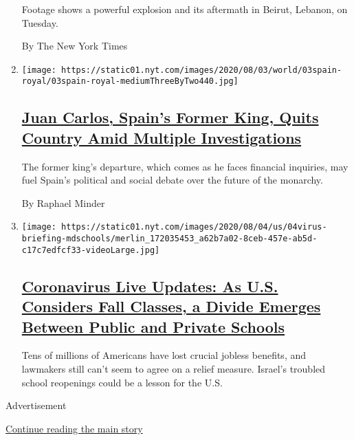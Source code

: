 \begin{enumerate}
  Footage shows a powerful explosion and its aftermath in Beirut,
  Lebanon, on Tuesday.

  By The New York Times
\item
  \texttt{[image: https://static01.nyt.com/images/2020/08/03/world/03spain-royal/03spain-royal-mediumThreeByTwo440.jpg]}

  \hypertarget{juan-carlos-spains-former-king-quits-country-amid-multiple-investigations}{%
  \subsection{\texorpdfstring{\href{/2020/08/03/world/europe/juan-carlos-leaves-spain.html}{Juan
  Carlos, Spain's Former King, Quits Country Amid Multiple
  Investigations}}{Juan Carlos, Spain's Former King, Quits Country Amid Multiple Investigations}}\label{juan-carlos-spains-former-king-quits-country-amid-multiple-investigations}}

  The former king's departure, which comes as he faces financial
  inquiries, may fuel Spain's political and social debate over the
  future of the monarchy.

  By Raphael Minder
\item
  \texttt{[image: https://static01.nyt.com/images/2020/08/04/us/04virus-briefing-mdschools/merlin\_172035453\_a62b7a02-8ceb-457e-ab5d-c17c7edfcf33-videoLarge.jpg]}

  \hypertarget{coronavirus-live-updates-as-us-considers-fall-classes-a-divide-emerges-between-public-and-private-schools}{%
  \subsection{\texorpdfstring{\href{/2020/08/04/world/coronavirus-cases.html}{Coronavirus
  Live Updates: As U.S. Considers Fall Classes, a Divide Emerges Between
  Public and Private
  Schools}}{Coronavirus Live Updates: As U.S. Considers Fall Classes, a Divide Emerges Between Public and Private Schools}}\label{coronavirus-live-updates-as-us-considers-fall-classes-a-divide-emerges-between-public-and-private-schools}}

  Tens of millions of Americans have lost crucial jobless benefits, and
  lawmakers still can't seem to agree on a relief measure. Israel's
  troubled school reopenings could be a lesson for the U.S.
\end{enumerate}

Advertisement

\protect\hyperlink{after-mid1}{Continue reading the main story}

